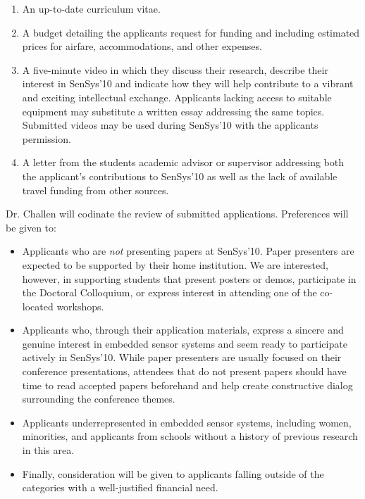 \begin{enumerate}

\item An up-to-date curriculum vitae.

\item A budget detailing the applicants request for funding and including
estimated prices for airfare, accommodations, and other expenses.

\item A five-minute video in which they discuss their research, describe
their interest in SenSys'10 and indicate how they will help contribute to a
vibrant and exciting intellectual exchange. Applicants lacking access to
suitable equipment may substitute a written essay addressing the same topics.
Submitted videos may be used during SenSys'10 with the applicants permission.

\item A letter from the students academic advisor or supervisor addressing
both the applicant's contributions to SenSys'10 as well as the lack of
available travel funding from other sources.

\end{enumerate}

Dr. Challen will codinate the review of submitted applications.
Preferences will be given to:

\begin{itemize}

\item Applicants who are \textit{not} presenting papers at SenSys'10. Paper
presenters are expected to be supported by their home institution. We are
interested, however, in supporting students that present posters or demos,
participate in the Doctoral Colloquium, or express interest in attending one
of the co-located workshops.

\item Applicants who, through their application materials, express a sincere
and genuine interest in embedded sensor systems and seem ready to participate
actively in SenSys'10. While paper presenters are usually focused on their
conference presentations, attendees that do not present papers should have
time to read accepted papers beforehand and help create constructive dialog
surrounding the conference themes.

\item Applicants underrepresented in embedded sensor systems, including
women, minorities, and applicants from schools without a history of previous
research in this area.

\item Finally, consideration will be given to applicants falling outside of
the categories with a well-justified financial need.

\end{itemize}

